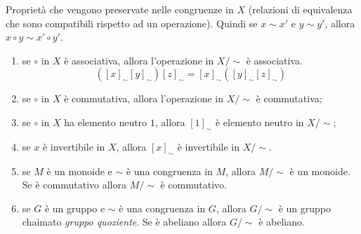 \documentclass[a4paper]{article}
\begin{document}
Proprietà che vengono preservate nelle congruenze in \(X\) (relazioni di equivalenza che sono compatibili rispetto ad un operazione).
Quindi se \(x\sim x'\) e \(y \sim y'\), allora \(x\circ y \sim x'\circ y'\).

\begin{enumerate}
    \item se \(\circ\) in \(X\) è associativa, allora l'operazione in \(X / \sim\) è associativa.
    \[
        ({[x]}_\sim{[y]}_\sim){[z]}_\sim =  {[x]}_\sim({[y]}_\sim{[z]}_\sim) 
    \]
    \item se \(\circ\) in \(X\) è commutativa, allora l'operazione in \(X / \sim\) è commutativa;
    \item se \(\circ\) in \(X\) ha elemento neutro \(1\), allora \({[1]}_\sim\) è elemento neutro in \(X / \sim\);
    \item se \(x\) è invertibile in \(X\), allora \({[x]}_\sim\) è invertibile in \(X / \sim\).
    \item se \(M\) è un monoide e \(\sim\) è una congruenza in \(M\), allora \(M / \sim\) è un monoide.
        Se è commutativo allora \(M/\sim\) è commutativo.
    \item se \(G\) è un gruppo e \(\sim\) è una congruenza in \(G\), allora \(G / \sim\) è un gruppo chaimato \emph{gruppo quoziente}.
        Se è abeliano allora \(G/\sim\) è abeliano.
\end{enumerate}


\end{document}

